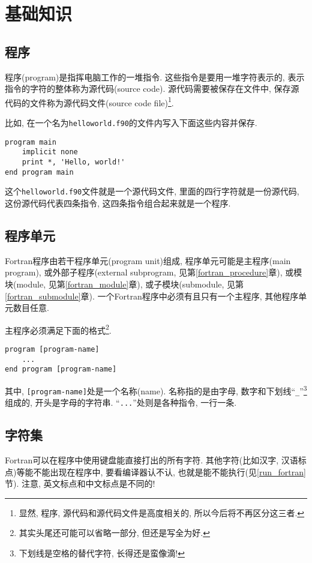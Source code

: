 \chapter{基础知识}

\section{程序}\label{fortran_program}

程序(program)是指挥电脑工作的一堆指令. 这些指令是要用一堆字符表示的, 表示指令的字符的整体称为源代码(source code). 源代码需要被保存在文件中, 保存源代码的文件称为源代码文件(source code file)\footnote{
    显然, 程序, 源代码和源代码文件是高度相关的, 所以今后将不再区分这三者.
}.

比如, 在一个名为\texttt{helloworld.f90}的文件内写入下面这些内容并保存.
\begin{lstlisting}
program main
    implicit none
    print *, 'Hello, world!'
end program main
\end{lstlisting}
这个\texttt{helloworld.f90}文件就是一个源代码文件, 里面的四行字符就是一份源代码, 这份源代码代表四条指令, 这四条指令组合起来就是一个程序.

\section{程序单元}

Fortran程序由若干程序单元(program unit)组成, 程序单元可能是主程序(main program), 或外部子程序(external subprogram, 见第\ref{fortran_procedure}章), 或模块(module, 见第\ref{fortran_module}章), 或子模块(submodule, 见第\ref{fortran_submodule}章). 一个Fortran程序中必须有且只有一个主程序, 其他程序单元数目任意.

主程序必须满足下面的格式\footnote{
    其实头尾还可能可以省略一部分, 但还是写全为好.
}.
\begin{lstlisting}
program [program-name]
    ...
end program [program-name]
\end{lstlisting}
其中, \texttt{[program-name]}处是一个名称(name). 名称指的是由字母, 数字和下划线``\texttt{\_{}}''\footnote{
    下划线是空格的替代字符, 长得还是蛮像滴!
}组成的, 开头是字母的字符串. ``\texttt{...}''处则是各种指令, 一行一条.

\section{字符集}

Fortran可以在程序中使用键盘能直接打出的所有字符. 其他字符(比如汉字, 汉语标点)等能不能出现在程序中, 要看编译器认不认, 也就是能不能执行(见\ref{run_fortran}节). 注意, 英文标点和中文标点是不同的!

